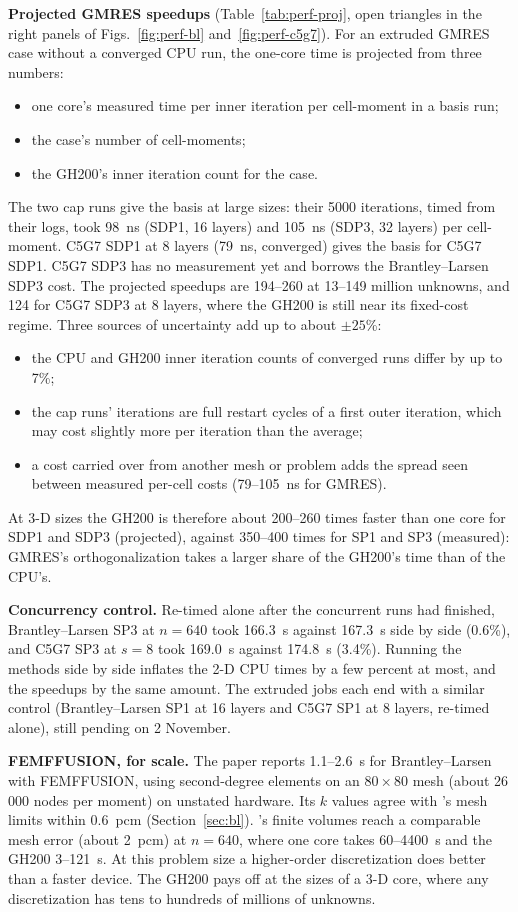 \textbf{Projected GMRES speedups} (Table~\ref{tab:perf-proj}, open
triangles in the right panels of Figs.~\ref{fig:perf-bl}
and~\ref{fig:perf-c5g7}). For an extruded GMRES case without a converged CPU
run, the one-core time is projected from three numbers:
\begin{itemize}
\item one core's measured time per inner iteration per cell-moment in a
  basis run;
\item the case's number of cell-moments;
\item the GH200's inner iteration count for the case.
\end{itemize}
The two cap runs give the basis at large sizes: their 5000 iterations,
timed from their logs, took 98~ns (SDP1, 16 layers) and 105~ns (SDP3, 32
layers) per cell-moment. C5G7 SDP1 at 8 layers (79~ns, converged) gives the
basis for C5G7 SDP1. C5G7 SDP3 has no measurement yet and borrows the
Brantley--Larsen SDP3 cost. The projected speedups are 194--260 at 13--149
million unknowns, and 124 for C5G7 SDP3 at 8 layers, where the GH200 is
still near its fixed-cost regime. Three sources of uncertainty add up to
about $\pm 25$\%:
\begin{itemize}
\item the CPU and GH200 inner iteration counts of converged runs differ by
  up to 7\%;
\item the cap runs' iterations are full restart cycles of a first outer
  iteration, which may cost slightly more per iteration than the average;
\item a cost carried over from another mesh or problem adds the spread seen
  between measured per-cell costs (79--105~ns for GMRES).
\end{itemize}
At 3-D sizes the GH200 is therefore about 200--260 times faster than one
core for SDP1 and SDP3 (projected), against 350--400 times for SP1 and SP3
(measured): GMRES's orthogonalization takes a larger share of the GH200's
time than of the CPU's.

\textbf{Concurrency control.} Re-timed alone after the concurrent runs had
finished, Brantley--Larsen SP3 at $n = 640$ took 166.3~s against 167.3~s
side by side (0.6\%), and C5G7 SP3 at $s = 8$ took 169.0~s against 174.8~s
(3.4\%). Running the methods side by side inflates the 2-D CPU times by a
few percent at most, and the speedups by the same amount. The extruded jobs
each end with a similar control (Brantley--Larsen SP1 at 16 layers and C5G7
SP1 at 8 layers, re-timed alone), still pending on 2 November.

\textbf{FEMFFUSION, for scale.} The paper reports 1.1--2.6~s for
Brantley--Larsen with FEMFFUSION, using second-degree elements on an
$80 \times 80$ mesh (about 26\,000 nodes per moment) on unstated hardware.
Its $k$ values agree with \garnet's mesh limits within 0.6~pcm
(Section~\ref{sec:bl}). \garnet's finite volumes reach a comparable mesh
error (about 2~pcm) at $n = 640$, where one core takes 60--4400~s and the
GH200 3--121~s. At this problem size a higher-order discretization does
better than a faster device. The GH200 pays off at the sizes of a 3-D core,
where any discretization has tens to hundreds of millions of unknowns.
